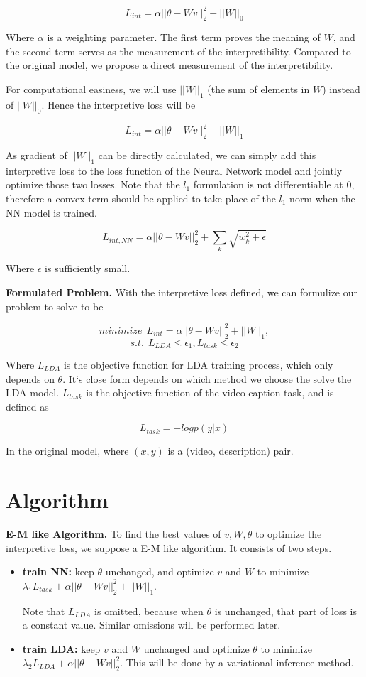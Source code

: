 \documentclass[12pt,a4paper]{ctexart}
\begin{document}
$$L_{int} = \alpha ||\theta - Wv||_2^2 + ||W||_0$$

Where $\alpha$ is a weighting parameter. The first term proves the meaning of $W$, and the second term serves as the measurement of the interpretibility. Compared to the original model, we propose a direct measurement of the interpretibility.

For computational easiness, we will use $||W||_1$ (the sum of elements in $W$) instead of $||W||_0$. Hence the interpretive loss will be

$$L_{int} = \alpha ||\theta - Wv||_2^2 + ||W||_1$$

As gradient of $||W||_1$ can be directly calculated, we can simply add this interpretive loss to the loss function of the Neural Network model and jointly optimize those two losses. Note that the $l_1$ formulation is not differentiable at 0, therefore a convex term should be applied to take place of the $l_1$ norm when the NN model is trained.

$$L_{int,NN} = \alpha ||\theta - Wv||_2^2 + \sum_k{\sqrt{w_k^2 + \epsilon}}$$

Where $\epsilon$ is sufficiently small.


\textbf{Formulated Problem.} With the interpretive loss defined, we can formulize our problem to solve to be

$$minimize ~~ L_{int} = \alpha ||\theta - Wv||_2^2 + ||W||_1,$$
$$ s.t. ~~ L_{LDA} \leq \epsilon_1, L_{task} \leq \epsilon_2$$

Where $L_{LDA}$ is the objective function for LDA training process, which only depends on $\theta$. It`s close form depends on which method we choose the solve the LDA model. $L_{task}$ is the objective function of the video-caption task, and is defined as

$$L_{task} = -log p(y|x)$$

In the original model, where $(x, y)$ is a (video, description) pair.

\section{Algorithm}

\textbf{E-M like Algorithm.} To find the best values of $v, W, \theta$ to optimize the interpretive loss, we suppose a E-M like algorithm. It consists of two steps.

\begin{itemize}
	\item \textbf{train NN:} keep $\theta$ unchanged, and optimize $v$ and $W$ to minimize $\lambda_1 L_{task} + \alpha ||\theta - Wv||_2^2 + ||W||_1$. 
	
	Note that $L_{LDA}$ is omitted, because when $\theta$ is unchanged, that part of loss is a constant value. Similar omissions will be performed later.
	
	\item \textbf{train LDA:} keep $v$ and $W$ unchanged and optimize $\theta$ to minimize $\lambda_2 L_{LDA} + \alpha ||\theta - Wv||_2^2$. This will be done by a variational inference method.
	
\end{itemize}
\end{document}
